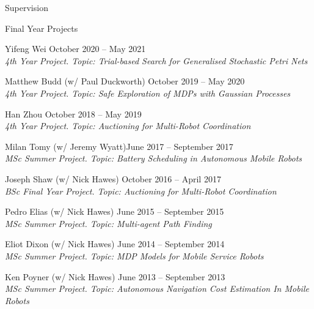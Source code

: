 \begin{rSection}{Supervision}
\pagebreak

\begin{rSubsection}{Final Year Projects}{}{}{}

\item Yifeng Wei  \hfill October 2020 -- May 2021\\
\textit{4th Year Project. Topic: Trial-based Search for Generalised Stochastic Petri Nets}

\item Matthew Budd  (w/ Paul Duckworth)  \hfill October 2019 -- May 2020\\
\textit{4th Year Project. Topic: Safe Exploration of MDPs with Gaussian Processes}

\item Han Zhou \hfill October 2018 -- May 2019\\
\textit{4th Year Project. Topic: Auctioning for Multi-Robot Coordination}

\item   Milan Tomy (w/ Jeremy Wyatt)\hfill June 2017 -- September 2017\\
\textit{MSc Summer Project. Topic: Battery Scheduling in Autonomous Mobile Robots}

\item   Joseph Shaw (w/ Nick Hawes) \hfill October 2016 -- April 2017\\
\textit{BSc Final Year Project. Topic: Auctioning for Multi-Robot Coordination}

\item  Pedro Elias (w/ Nick Hawes)  \hfill June 2015 -- September 2015\\
\textit{MSc Summer Project. Topic: Multi-agent Path Finding}

\item  Eliot Dixon  (w/ Nick Hawes) \hfill June 2014 -- September 2014\\
\textit{MSc Summer Project. Topic: MDP Models for Mobile Service Robots}

\item  Ken Poyner (w/ Nick Hawes) \hfill June 	2013 -- September 2013\\
\textit{MSc Summer Project. Topic: Autonomous Navigation Cost Estimation In Mobile Robots}

\end{rSubsection}

\end{rSection}
